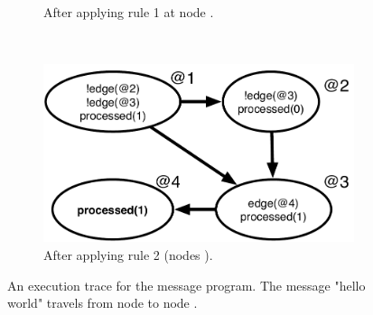 \begin{figure}[h]
\begin{subfigure}[b]{0.4\textwidth}
                \caption{After applying rule 1 at node .}
                \label{fig:message_trace3}
        \end{subfigure}%
        ~
        \begin{subfigure}[b]{0.4\textwidth}
                  \includegraphics[width=\textwidth]{figures/message/message_trace4}
                  \caption{After applying rule 2 (nodes ).}
                  \label{fig:message_trace4}
          \end{subfigure}
        \caption{An execution trace for the message program. The message "hello
        world" travels from node  to node .}\label{fig:message_trace}
\end{figure}

